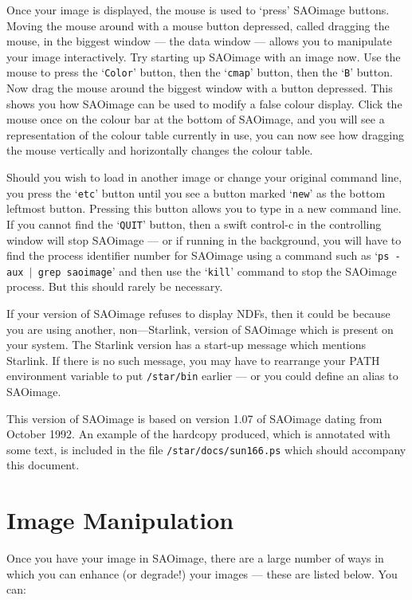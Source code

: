 Once your image is displayed, the mouse is used to `press' SAOimage
buttons. Moving the mouse around with a mouse button depressed, called
dragging the mouse, in the biggest window --- the data window ---
allows you to manipulate your image interactively. Try starting up
SAOimage with an image now. Use the mouse to press the `{\tt Color}'
button, then the `{\tt cmap}' button, then the `{\tt B}' button. Now
drag the mouse around the biggest window with a button depressed. This
shows you how SAOimage can be used to modify a false colour
display. Click the mouse once on the colour bar at the bottom of
SAOimage, and you will see a representation of the colour table
currently in use, you can now see how dragging the mouse vertically
and horizontally changes the colour table.

Should you wish to load in another image or change your original command
line, you press the `{\tt etc}' button until you see a button marked
`{\tt new}' as the bottom leftmost button. Pressing this button allows
you to type in a new command line. If you cannot find the `{\tt QUIT}'
button, then a swift control-c in the controlling window will stop
SAOimage --- or if running in the background, you will have to find the
process identifier number for SAOimage using a command such as `{\tt ps
-aux $|$ grep saoimage}' and then use the `{\tt kill}' command to stop
the SAOimage process. But this should rarely be necessary.

If your version of SAOimage refuses to display NDFs, then it could be
because you are using another, non---Starlink, version of SAOimage which
is present on your system. The Starlink version has a start-up message
which mentions Starlink. If there is no such message, you may have to
rearrange your PATH environment variable to put {\tt /star/bin}
earlier --- or you could define an alias to SAOimage.

This version of SAOimage is based on version 1.07 of SAOimage dating from
October 1992. An example of the hardcopy produced, which is annotated with
some text, is included in the file {\tt /star/docs/sun166.ps} which should
accompany this document.

\section{Image Manipulation}

Once you have your image in SAOimage, there are a large number of ways
in  which you can enhance (or degrade!) your images --- these are listed
below. You can:

